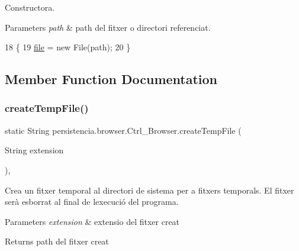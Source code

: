 Constructora. 


\begin{DoxyParams}{Parameters}
{\em path} & path del fitxer o directori referenciat. \\
\hline
\end{DoxyParams}

\begin{DoxyCode}
18                                      \{
19         \hyperlink{classpersistencia_1_1browser_1_1Ctrl__Browser_a72c151aed575c0848f7dbb1609b373c8}{file} = \textcolor{keyword}{new} File(path);
20     \}
\end{DoxyCode}


\subsection{Member Function Documentation}
\mbox{\label{classpersistencia_1_1browser_1_1Ctrl__Browser_ad64712e539747815fb590a7adfaf5517}} 
\subsubsection{\texorpdfstring{create\+Temp\+File()}{createTempFile()}}
{\footnotesize\ttfamily static String persistencia.\+browser.\+Ctrl\+\_\+\+Browser.\+create\+Temp\+File (\begin{DoxyParamCaption}\item[{String}]{extension }\end{DoxyParamCaption})\hspace{0.3cm}{\ttfamily [inline]}, {\ttfamily [static]}}



Crea un fitxer temporal al directori de sistema per a fitxers temporals. El fitxer serà esborrat al final de l\textquotesingle{}execució del programa. 


\begin{DoxyParams}{Parameters}
{\em extension} & extensio del fitxer creat \\
\hline
\end{DoxyParams}
\begin{DoxyReturn}{Returns}
path del fitxer creat 
\end{DoxyReturn}

